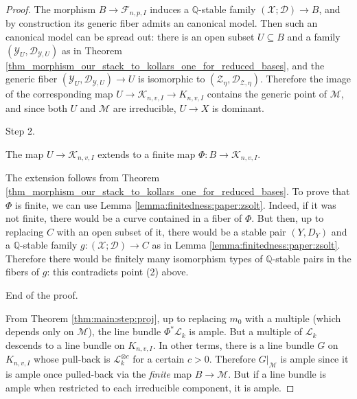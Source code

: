 \documentclass{amsart}
\newcommand{\bQ}{\mathbb{Q}}
\newcommand{\sF}{\mathscr{F}}
\newcommand{\cD}{\mathcal{D}}
\newcommand{\cK}{\mathcal{K}}
\newcommand{\cL}{\mathcal{L}}
\newcommand{\cM}{\mathcal{M}}
\newcommand{\cX}{\mathcal{X}}
\newcommand{\cY}{\mathcal{Y}}
\newcommand{\cZ}{\mathcal{Z}}
\theoremstyle{definition}
\begin{document}
\begin{proof}
The morphism $B\to \sF_{n,p,I}$ induces a $\bQ$-stable family $(\cX;\cD)\to B$, and by construction its generic fiber admits an canonical model.
Then such an canonical model can be spread out: there is an open subset $U\subseteq B$ and a family $(\cY_U,\cD_{\cY,U})$ as in Theorem \ref{thm_morphism_our_stack_to_kollars_one_for_reduced_bases}, and the generic fiber $(\cY_U,\cD_{\cY,U})\to U$ is isomorphic to $(\cZ_\eta, \cD_{\cZ,\eta})$. Therefore the image of the corresponding map $U\to \cK_{n,v,I}\to K_{n,v,I}$ contains the generic point of $\cM$, and since both $U$ and $\cM$ are irreducible, $U\to X$ is dominant.

\begin{bf}Step 2.\end{bf} The map $U\to \cK_{n,v,I}$ extends to a finite map $\Phi \colon B\to \cK_{n,v,I}$.

The extension follows from Theorem \ref{thm_morphism_our_stack_to_kollars_one_for_reduced_bases}. To prove that $\Phi$ is finite, we can use Lemma \ref{lemma:finitedness:paper:zsolt}. Indeed, if it was not finite, there would be a curve contained in a fiber of $\Phi$. But then, up to replacing $C$ with an open subset of it, there would be a stable pair $(Y,D_Y)$ and a $\bQ$-stable family $g \colon (\cX;\cD)\to C$ as in Lemma \ref{lemma:finitedness:paper:zsolt}. Therefore there would be finitely many isomorphism types of $\bQ$-stable pairs in the fibers of $g$: this contradicts point (2) above.

\begin{bf}End of the proof.\end{bf} From Theorem \ref{thm:main:step:proj}, up to replacing $m_0$ with a multiple (which depends only on $\cM$), the line bundle $\Phi^*\cL_k$ is ample. But a multiple of $\cL_k$ descends to a line bundle on $K_{n,v,I}$. In other terms, there is a line bundle $G$ on $K_{n,v,I}$ whose pull-back is $\cL_k^{\otimes c}$ for a certain $c>0$. Therefore $G|_{\cM}$ is ample since it is ample once pulled-back via the \emph{finite} map $B\to \cM$. But if a line bundle is ample when restricted to each irreducible component, it is ample.
\end{proof}
\end{document}
